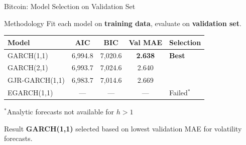\documentclass[9pt, aspectratio=169, t]{beamer}
\begin{document}
\begin{frame}{Bitcoin: Model Selection on Validation Set}
    \vspace{-0.2cm}
    {\scriptsize
    \begin{block}{Methodology}
            Fit each model on \textbf{training data}, evaluate on \textbf{validation set}.
        \end{block}

        \vspace{0.1cm}

        \begin{center}
        \begin{tabular}{lcccl}
            \toprule
            \textbf{Model} & \textbf{AIC} & \textbf{BIC} & \textbf{Val MAE} & \textbf{Selection} \\
            \midrule
            GARCH(1,1) & 6,994.8 & 7,020.6 & \textbf{2.638} & \cellcolor{Forest!20}\textbf{Best} \\
            GARCH(2,1) & 6,993.7 & 7,024.6 & 2.640 & \\
            GJR-GARCH(1,1) & 6,983.7 & 7,014.6 & 2.669 & \\
            EGARCH(1,1) & --- & --- & --- & Failed$^*$ \\
            \bottomrule
        \end{tabular}
        \end{center}

        \vspace{0.0cm}
        {\footnotesize $^*$Analytic forecasts not available for $h > 1$}

        \vspace{0.1cm}

        \begin{exampleblock}{Result}
            \textbf{GARCH(1,1)} selected based on lowest validation MAE for volatility forecasts.
        \end{exampleblock}
    }
\end{frame}
\end{document}
